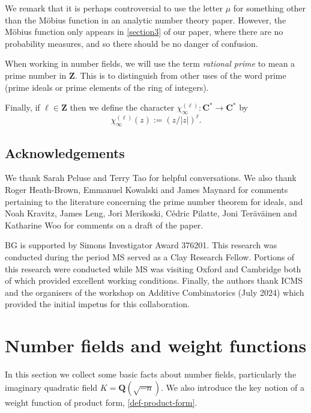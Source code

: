 \documentclass[11pt,reqno]{amsart}
\numberwithin{equation}{section}
\theoremstyle{definition}
\theoremstyle{remark}
\newcommand\Z{\mathbf{Z}}
\newcommand\Q{\mathbf{Q}}
\newcommand\C{\mathbf{C}}
\begin{document}
We remark that it is perhaps controversial to use the letter $\mu$ for something other than the M\"obius function in an analytic number theory paper. However, the M\"obius function only appears in \cref{section3} of our paper, where there are no probability measures, and so there should be no danger of confusion.

When working in number fields, we will use the term \emph{rational prime} to mean a prime number in $\Z$. This is to distinguish from other uses of the word prime (prime ideals or prime elements of the ring of integers).

Finally, if $\ell \in \Z$ then we define the character $\chi_{\infty}^{(\ell)} : \C^* \rightarrow \C^*$ by 
\begin{equation}\label{chi-infinity-def} \chi_{\infty}^{(\ell)}(z) := (z/|z|)^{\ell}.\end{equation}


\subsection{Acknowledgements}
We thank Sarah Peluse and Terry Tao for helpful conversations. We also thank Roger Heath-Brown, Emmanuel Kowalski and James Maynard for comments pertaining to the literature concerning the prime number theorem for ideals, and Noah Kravitz, James Leng, Jori Merikoski, C\'edric Pilatte, Joni Ter\"av\"ainen and Katharine Woo for comments on a draft of the paper.

BG is supported by Simons Investigator Award 376201. This research was conducted during the period MS served as a Clay Research Fellow. Portions of this research were conducted while MS was visiting Oxford and Cambridge both of which provided excellent working conditions. Finally, the authors thank ICMS and the organisers of the workshop on Additive Combinatorics (July 2024) which provided the initial impetus for this collaboration. 





\section{Number fields and weight functions}\label{section2}

In this section we collect some basic facts about number fields, particularly the imaginary quadratic field $K = \Q(\sqrt{-n})$. We also introduce the key notion of a weight function of product form, \cref{def-product-form}.
\end{document}
